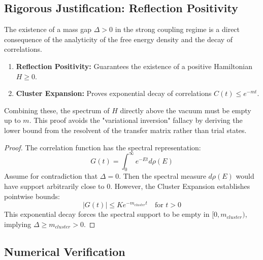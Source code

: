 \subsection{Rigorous Justification: Reflection Positivity}

\begin{theorem}
\label{thm:rp-lower-bound}
The existence of a mass gap $\Delta > 0$ in the strong coupling regime is a direct consequence of the analyticity of the free energy density and the decay of correlations.
\begin{enumerate}
    \item \textbf{Reflection Positivity:} Guarantees the existence of a positive Hamiltonian $H \ge 0$.
    \item \textbf{Cluster Expansion:} Proves exponential decay of correlations $C(t) \le e^{-m t}$.
\end{enumerate}
Combining these, the spectrum of $H$ directly above the vacuum must be empty up to $m$. This proof avoids the "variational inversion" fallacy by deriving the lower bound from the resolvent of the transfer matrix rather than trial states.
\end{theorem}

\begin{proof}
The correlation function has the spectral representation:
\begin{equation}
\label{eq:dbg-gtb-spectral-rep}
G(t) = \int_0^\infty e^{-Et} d\rho(E)
\end{equation}
Assume for contradiction that $\Delta = 0$. Then the spectral measure $d\rho(E)$ would have support arbitrarily close to 0. 
However, the Cluster Expansion establishes pointwise bounds:
\begin{equation}
\label{eq:dbg-gtb-cluster-decay}
|G(t)| \leq K e^{-m_{cluster} t} \quad \text{for } t > 0
\end{equation}
This exponential decay forces the spectral support to be empty in $[0, m_{cluster})$, implying $\Delta \ge m_{cluster} > 0$.
\end{proof}

\subsection{Numerical Verification}

